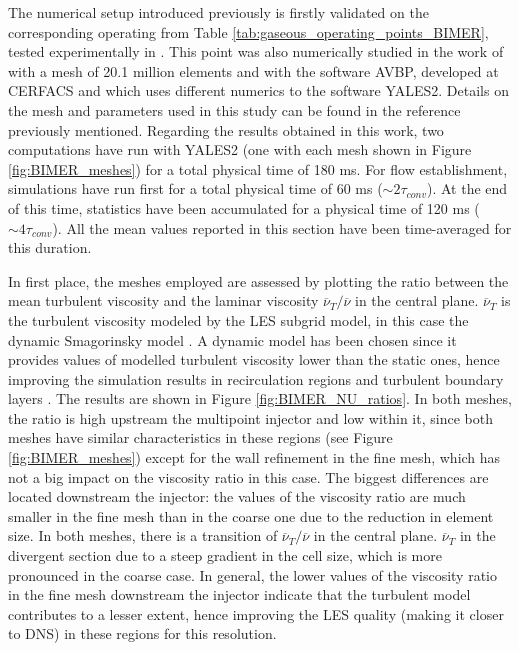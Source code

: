 The numerical setup introduced previously is firstly validated on the corresponding operating from Table \ref{tab:gaseous_operating_points_BIMER}, tested experimentally in . This point was also numerically studied in the work of  with a mesh of 20.1 million elements and with the software AVBP, developed at CERFACS  and which uses different numerics to the software YALES2. Details on the mesh and parameters used in this study can be found in the reference previously mentioned. Regarding the results obtained in this work, two computations have run with YALES2 (one with each mesh shown in Figure \ref{fig:BIMER_meshes}) for a total physical time of 180 ms. For flow establishment, simulations have run first for a total physical time of 60 ms ($\sim 2 \tau_{conv}$). At the end of this time, statistics have been accumulated for a physical time of 120 ms ($\sim 4 \tau_{conv}$). All the mean values reported in this section have been time-averaged for this duration.

In first place, the meshes employed are assessed by plotting the ratio between the mean turbulent viscosity and the laminar viscosity $\overline{\nu}_T / \overline{\nu}$ in the central plane. $\overline{\nu}_T$ is the turbulent viscosity modeled by the LES subgrid model, in this case the dynamic Smagorinsky model . A dynamic model has been chosen since it provides values of modelled turbulent viscosity lower than the static ones, hence improving the simulation results in recirculation regions and turbulent boundary layers . The results are shown in Figure \ref{fig:BIMER_NU_ratios}. In both meshes, the ratio is high upstream the multipoint injector and low within it, since both meshes have similar characteristics in these regions (see Figure \ref{fig:BIMER_meshes}) except for the wall refinement in the fine mesh, which has not a big impact on the viscosity ratio in this case. The biggest differences are located downstream the injector: the values of the viscosity ratio are much smaller in the fine mesh than in the coarse one due to the reduction in element size. In both meshes, there is a transition of  $\overline{\nu}_T / \overline{\nu}$ in the central plane. $\overline{\nu}_T$ in the divergent section due to a steep gradient in the cell size, which is more pronounced in the coarse case. In general, the lower values of the viscosity ratio in the fine mesh downstream the injector indicate that the turbulent model contributes to a lesser extent, hence improving the LES quality (making it closer to DNS) in these regions for this resolution.


